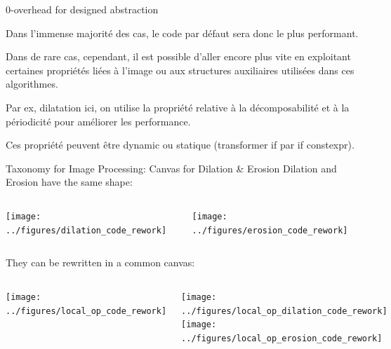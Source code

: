 \documentclass[12pt,aspectratio=169]{beamer}
\begin{document}
\begin{frame}[fragile]{0-overhead for designed abstraction}
{    Dans l'immense majorité des cas, le code par défaut sera donc le plus performant.

    Dans de rare cas, cependant, il est possible d'aller encore plus vite en exploitant certaines propriétés liées à l'image ou aux structures auxiliaires utilisées dans ces algorithmes.

    Par ex, dilatation ici, on utilise la propriété relative à la décomposabilité et à la périodicité pour améliorer les performance.

    Ces propriété peuvent être dynamic ou statique (transformer if par if constexpr).
  }
\end{frame}

\begin{frame}[fragile]{Taxonomy for Image Processing: Canvas for Dilation \& Erosion}
  Dilation and Erosion have the same shape:
  \begin{columns}[T,onlytextwidth]
    \texttt{[image: ../figures/dilation\_code\_rework]}

    \texttt{[image: ../figures/erosion\_code\_rework]}
  \end{columns}
  \bigskip
  They can be rewritten in a common canvas:
  \begin{columns}[T,onlytextwidth]
    \texttt{[image: ../figures/local\_op\_code\_rework]}

    \texttt{[image: ../figures/local\_op\_dilation\_code\_rework]}
    \texttt{[image: ../figures/local\_op\_erosion\_code\_rework]}
  \end{columns}
  \pdfcomment[icon=Note]{   }
  \pdfcomment[icon=Note]{   }
  \pdfcomment[icon=Note]{   }
\end{frame}
\end{document}
